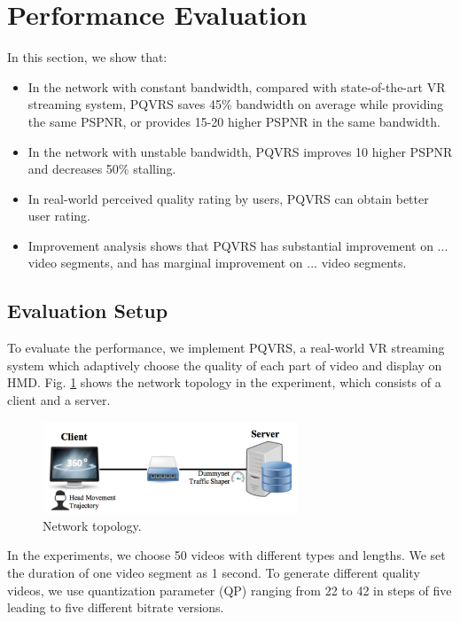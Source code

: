 \section{Performance Evaluation}

In this section, we show that:

\begin{itemize}

\item In the network with constant bandwidth, compared with state-of-the-art VR streaming system, PQVRS saves 45\% bandwidth on average while providing the same PSPNR, or provides 15-20 higher PSPNR in the same bandwidth.

\item In the network with unstable bandwidth, PQVRS improves 10 higher PSPNR and decreases 50\% stalling.

\item In real-world perceived quality rating by users, PQVRS can obtain better user rating.

\item Improvement analysis shows that PQVRS has substantial improvement on ... video segments, and has marginal improvement on ... video segments.

\end{itemize}

\subsection{Evaluation Setup}

To evaluate the performance, we implement PQVRS, a real-world VR streaming system which adaptively choose the quality of each part of video and display on HMD. Fig. \ref{network} shows the network topology in the experiment, which consists of a client and a server.

\begin{figure}
  \centering
  \includegraphics[width=3in]{images/network.jpg}
  \caption{Network topology.}
  \label{network}
  \end{figure}

In the experiments, we choose 50 videos with different types and lengths. We set the duration of one video segment as 1 second. To generate different quality videos, we use quantization parameter (QP) ranging from 22 to 42 in steps of five leading to five different bitrate versions. 

